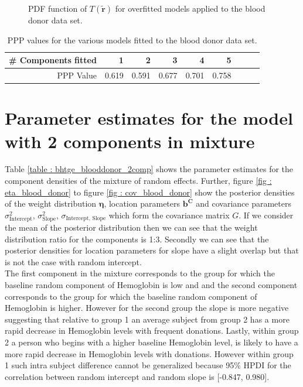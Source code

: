 \begin{figure}[!htb]
	\caption{PDF function of $T(\boldsymbol{\tilde{r}})$ for overfitted models applied to the blood donor data set.}
	\label{fig : ppc_blood_donor_overfitted}    
\end{figure} 

\begin{table}[!htb]
\centering
\captionsetup{justification=centering}
\caption{PPP values for the various models fitted to the blood donor data set.}
\label{table : ppp_blood_donor}
\begin{tabular}{@{}rrrrrrrrr@{}}
\toprule
\# Components fitted & 1 & 2 & 3 & 4 & 5\\ \midrule
PPP Value & 0.619 & 0.591 & 0.677 & 0.701 & 0.758\\ \bottomrule
\end{tabular}
\end{table}

\section{Parameter estimates for the model with 2 components in mixture}
Table \ref{table : bhtge_blooddonor_2comp} shows the parameter estimates for the component densities of the mixture of random effects. Further, figure \ref{fig : eta_blood_donor} to figure \ref{fig : cov_blood_donor} show the posterior densities of the weight distribution $\boldsymbol{\eta}$, location parameters $\boldsymbol{b^C}$ and covariance parameters $\sigma^2_\text{Intercept}$, $\sigma^2_\text{Slope}$, $\sigma_\text{Intercept, Slope}$ which form the covariance matrix $G$. If we consider the mean of the posterior distribution then we can see that the weight distribution ratio for the components is 1:3. Secondly we can see that the posterior densities for location parameters for slope have a slight overlap but that is not the case with random intercept.\\

The first component in the mixture corresponds to the group for which the baseline random component of Hemoglobin is low and and the second component corresponds to the group for which the baseline random component of Hemoglobin is higher. However for the second group the slope is more negative suggesting that relative to group 1 an average subject from group 2 has a more rapid decrease in Hemoglobin levels with frequent donations. Lastly, within group 2 a person who begins with a higher baseline Hemoglobin level, is likely to have a more rapid decrease in Hemoglobin levels with donations. However within group 1 such intra subject difference cannot be generalized because 95\% HPDI for the correlation between random intercept and random slope is [-0.847, 0.980].

